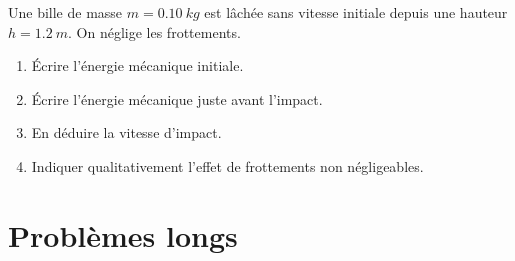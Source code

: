 \documentclass[11pt,a4paper]{article}
\begin{document}
\begin{enumerate}[label=\textbf{Exercice \arabic*.},leftmargin=*]
Une bille de masse $m=0.10\ \si{kg}$ est lâchée sans vitesse initiale depuis une hauteur $h=1.2\ \si{m}$.
On néglige les frottements.
\begin{enumerate}[label=\alph*)]
\item Écrire l'énergie mécanique initiale.
\item Écrire l'énergie mécanique juste avant l'impact.
\item En déduire la vitesse d'impact.
\item Indiquer qualitativement l'effet de frottements non négligeables.
\end{enumerate}
\end{enumerate}
\section{Problèmes longs}
\end{document}
